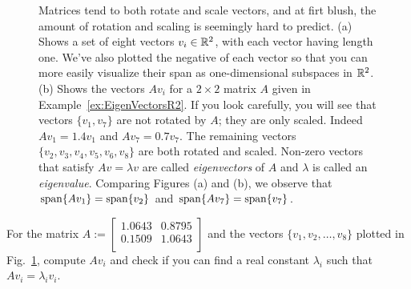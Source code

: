 \vspace*{.2cm}

\begin{figure}[h]%
\centering
{}%
\hspace{5pt}%
%
    \caption[]{Matrices tend to both rotate and scale vectors, and at firt blush, the amount of rotation and scaling is seemingly hard to predict. (a) Shows a set of eight vectors $v_i \in \mathbb R^2$, with each vector having length one. We've also plotted the negative of each vector so that you can more easily visualize their span as one-dimensional subspaces in $\mathbb R^2$. (b) Shows the vectors $A v_i$ for a $2 \times 2$ matrix $A$ given in Example~\ref{ex:EigenVectorsR2}. If you look carefully, you will see that vectors $\{v_1, v_7 \}$ are not rotated by $A$; they are only scaled. Indeed $Av_1 = 1.4 v_1$ and $Av_7 = 0.7 v_7$. The remaining vectors $\{ v_2, v_3, v_4, v_5, v_6, v_8 \}$ are both rotated and scaled. Non-zero vectors that satisfy $Av = \lambda v$ are called \textit{eigenvectors} of $A$ and $\lambda$ is called an \textit{eigenvalue}. Comparing Figures (a) and (b), we observe that $\mathrm{span} \{ A v_1 \} =\mathrm{span} \{ v_2 \}$ and $\mathrm{span} \{ A v_7 \} =\mathrm{span} \{ v_7 \}$.
    }
    \label{fig:MotivateEigenvectorsEigenvalues}
\end{figure}


\begin{example} \label{ex:EigenVectorsR2}
For the matrix 
$
A:=\left[
\begin{array}{cc}
1.0643 & 0.8795 \\
0.1509 & 1.0643 \\
\end{array}
\right]
$
and the vectors $\{v_1, v_2, \ldots, v_8 \}$ plotted in Fig.~\ref{fig:MotivateEigenvectorsEigenvalues}, compute $A v_i$ and check if you can find a real constant $\lambda_i$ such that $Av_i = \lambda_i v_i$.
\end{example}
\vspace*{.3cm}

